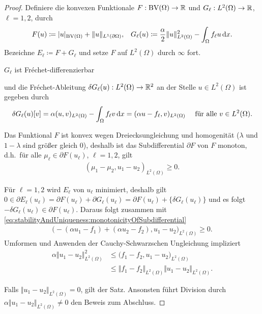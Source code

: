 \begin{proof}
  Definiere die konvexen Funktionale $F:\textup{BV}(\Omega)\to \mathbb{R}$ und 
  $G_\ell:L^2(\Omega)\to \mathbb{R}$, $\ell=1,2$, durch
  \begin{align*}
    F(u) &\coloneqq |u|_{\textup{BV}(\Omega)} + \Vert u \Vert_{L^1(\partial\Omega)},&
    G_\ell(u)\coloneqq \frac{\alpha}{2}\Vert u\Vert_{L^2(\Omega)}^2 -
    \int_\Omega f_\ell u\,\mathrm{d}x.
  \end{align*}
  Bezeichne $E_\ell\coloneqq F+G_\ell$ und setze $F$ auf $L^2(\Omega)$
  durch $\infty$ fort.

  $G_\ell$ ist Fr\'echet-differenzierbar 


  und die Fr\'echet-Ableitung $\delta G_\ell(u):L^2(\Omega)\to\mathbb{R}^2 $ an der
  Stelle
  $u\in L^2(\Omega)$ ist gegeben durch
  \begin{align*}
    \delta G_\ell(u)[v] = \alpha (u,v)_{L^2(\Omega)} - \int_\Omega f_\ell v\,\mathrm{d}x 
    = (\alpha u-f_\ell ,v)_{L^2(\Omega)} \quad 
    \text{ für alle } v\in L^2(\Omega).
  \end{align*}

  Das Funktional $F$ ist konvex {\color{red} wegen Dreiecksungleichung und 
  homogenität ($\lambda$ und $1-\lambda$ sind größer gleich 0)}, deshalb 
   ist das
  Subdifferential
  $\partial F$ von $F$ monoton, d.h.\ für alle $\mu_\ell\in \partial F(u_\ell)$,
  $\ell=1,2$, gilt
  \begin{align}\label{eq:stabilityAndUniqueness:monotonicityOfSubdifferential}
    (\mu_1-\mu_2,u_1-u_2)_{L^2(\Omega)}\geq 0.
  \end{align}

  Für $\ell=1,2$ wird $E_\ell$ von $u_\ell$ minimiert, 
  deshalb gilt $0\in\partial E_\ell(u_\ell)
  = \partial F(u_\ell)+\partial G_\ell(u_\ell)=\partial F(u_\ell)+
  \{\delta G_\ell(u_\ell)\}$  und es folgt
  $-\delta G_\ell(u_\ell)\in\partial F(u_\ell)$.
  Daraus folgt zusammen mit
  \eqref{eq:stabilityAndUniqueness:monotonicityOfSubdifferential}
  \begin{align*}
    \big( -(\alpha u_1 - f_1) + (\alpha u_2 - f_2), u_1 - u_2\big)_{L^2(\Omega)}
    \geq 0.
  \end{align*}
  Umformen und Anwenden der Cauchy-Schwarzschen Ungleichung impliziert
  \begin{align*}
    \alpha \Vert u_1 - u_2 \Vert_{L^2(\Omega)}^2
    &\leq
    \big(f_1 -f_2, u_1-u_2 \big)_{L^2(\Omega)}\\
    &\leq
    \Vert f_1-f_2\Vert_{L^2(\Omega)}\Vert u_1 - u_2\Vert_{L^2(\Omega)}.
  \end{align*}

  Falls $\Vert u_1 - u_2 \Vert_{L^2(\Omega)} = 0$, gilt der Satz.
  Ansonsten führt Division durch\\
  $\alpha\Vert u_1 - u_2 \Vert_{L^2(\Omega)}\neq 0$ den 
  Beweis zum Abschluss.
\end{proof}
